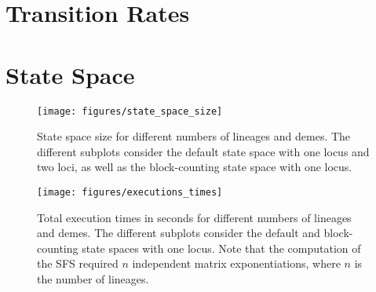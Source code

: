 \nolinenumbers

\renewcommand{\thefigure}{\thesection.\arabic{figure}}
\renewcommand{\thetable}{\thesection.\arabic{table}}


\section{Transition Rates}\label{sec:transition_rates}


\section{State Space}\label{sec:state_space}

\begin{figure}[H]
    \centering
    \texttt{[image: figures/state\_space\_size]}
    \caption{
        State space size for different numbers of lineages and demes.
        The different subplots consider the default state space with one locus and two loci, as well as the block-counting state space with one locus.
    }
    \label{fig:state_space_sizes}
\end{figure}

\begin{figure}[H]
    \centering
    \texttt{[image: figures/executions\_times]}
    \caption{
        Total execution times in seconds for different numbers of lineages and demes.
        The different subplots consider the default and block-counting state spaces with one locus.
        Note that the computation of the SFS required $n$ independent matrix exponentiations, where $n$ is the number of lineages.
    }
    \label{fig:executions_times}
\end{figure}
